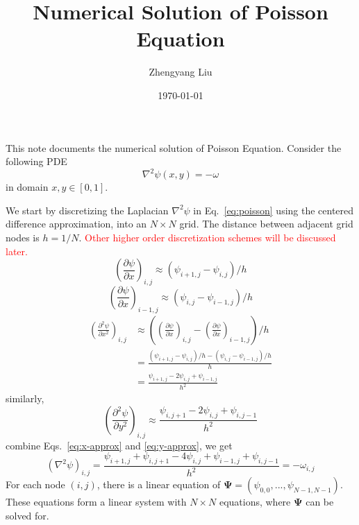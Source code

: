 \documentclass[onecolumn,aps, pre,amsmath,amssymb,longbibliography,11pt]{revtex4-2}
\begin{document}
\title{Numerical Solution of Poisson Equation}

\author{Zhengyang Liu}
\date{\today}
\maketitle

This note documents the numerical solution of Poisson Equation. Consider the following PDE
\begin{equation}\label{eq:poisson}
\nabla^2\psi(x, y) = -\omega
\end{equation}
in domain $x, y \in [0, 1]$.

We start by discretizing the Laplacian $\nabla^2\psi$ in Eq.~\ref{eq:poisson} using the centered difference approximation, into an $N\times N$ grid. The distance between adjacent grid nodes is $h=1/N$. \textcolor{red}{Other higher order discretization schemes will be discussed later.}
%
$$
\left(\frac{\partial\psi}{\partial x}\right)_{i, j} \approx (\psi_{i+1, j} - \psi_{i, j}) / h
$$
$$
\left(\frac{\partial\psi}{\partial x}\right)_{i-1, j} \approx (\psi_{i, j} - \psi_{i-1, j}) / h
$$
\begin{equation}\label{eq:x-approx}
\begin{split}
\left(\frac{\partial^2\psi}{\partial x^2}\right)_{i, j} & \approx \left(\left(\frac{\partial\psi}{\partial x}\right)_{i, j} - \left(\frac{\partial\psi}{\partial x}\right)_{i-1, j}\right)/ h \\
 & = \frac{(\psi_{i+1, j} - \psi_{i, j}) / h - (\psi_{i, j} - \psi_{i-1, j}) / h}{h} \\
 & = \frac{\psi_{i+1, j} - 2\psi_{i, j} + \psi_{i-1, j}}{h^2}
\end{split}
\end{equation}
%
similarly,
\begin{equation}\label{eq:y-approx}
\left(\frac{\partial^2\psi}{\partial y^2}\right)_{i, j} \approx \frac{\psi_{i, j+1} - 2\psi_{i, j} + \psi_{i, j-1}}{h^2}
\end{equation}
combine Eqs.~\ref{eq:x-approx} and \ref{eq:y-approx}, we get
\begin{equation}\label{eq:discrete-laplacian-approx}
(\nabla^2\psi)_{i, j} = \frac{\psi_{i+1, j} + \psi_{i, j+1} - 4\psi_{i, j} + \psi_{i-1, j} + \psi_{i, j-1}}{h^2} = -\omega_{i, j}
\end{equation}
%
For each node $(i, j)$, there is a linear equation of $\bm{\Psi}=(\psi_{0, 0}, ..., \psi_{N-1, N-1})$. These equations form a linear system with $N\times N$ equations, where $\bm{\Psi}$ can be solved for.
\end{document}
